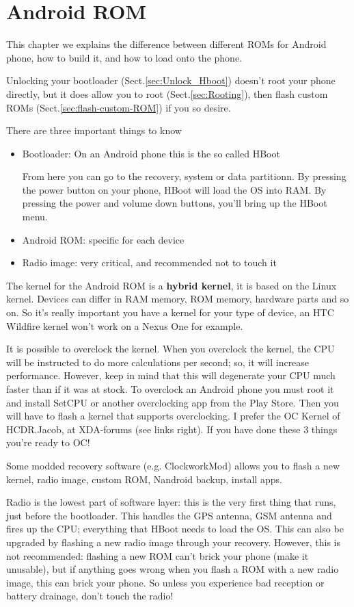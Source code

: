 \chapter{Android ROM}


This chapter we explains the difference between different ROMs for Android
phone, how to build it, and how to load onto the phone.

Unlocking your bootloader (Sect.\ref{sec:Unlock_Hboot}) doesn't root your phone
directly, but it does allow you to root (Sect.\ref{sec:Rooting}), then flash
custom ROMs (Sect.\ref{sec:flash-custom-ROM}) if you so desire.

There are three important things to know
\begin{itemize}
  \item Bootloader: On an Android phone this is the so called HBoot
  
  From here you can go to the recovery, system or data partitionn.  By pressing
  the power button on your phone, HBoot will load the OS into RAM. By pressing
  the power and volume down buttons, you'll bring up the HBoot menu.

  \item Android ROM: specific for each device
  
  \item Radio image: very critical, and recommended not to touch it
\end{itemize}


The kernel for the Android ROM is a {\bf hybrid kernel}, it is based on the
Linux kernel. Devices can differ in RAM memory, ROM memory, hardware parts and so on.
So it's really important you have a kernel for your type of device, an HTC
Wildfire kernel won't work on a Nexus One for example.

It is possible to overclock the kernel. When you overclock the kernel, the CPU
will be instructed to do more calculations per second; so, it will increase
performance.
However, keep in mind that this will degenerate your CPU much faster than if it
was at stock. To overclock an Android phone you must root it and install SetCPU
or another overclocking app from the Play Store. Then you will have to flash a
kernel that supports overclocking. I prefer the OC Kernel of HCDR.Jacob, at
XDA-forums (see links right). If you have done these 3 things you're ready to
OC!

Some modded recovery software (e.g. ClockworkMod) allows you to flash a new
kernel, radio image, custom ROM, Nandroid backup, install apps.

Radio is the lowest part of software layer: this is the very first thing that
runs, just before the bootloader. This handles the GPS antenna, GSM antenna and
fires up the CPU; everything that HBoot needs to load the OS.
This can also be upgraded by flashing a new radio image through your recovery.
However, this is not recommended: flashing a new ROM can't brick your phone
(make it unusable), but if anything goes wrong when you flash a ROM with a new
radio image, this can brick your phone. So unless you experience bad reception
or battery drainage, don't touch the radio!



